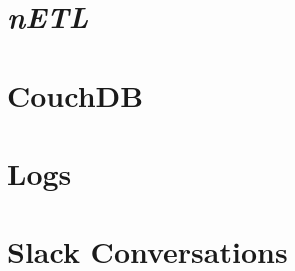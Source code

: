 \documentclass[
    parskip=full,
    a4paper
]{report}
\begin{document}



\begin{appendices}
    \chapter{\textit{nETL}}
    
    
    
    \chapter{CouchDB}
    
    \chapter{Logs}
    
    \chapter{Slack Conversations}
    
    \newpage
    \listoffigures
    \newpage
    \listoftables
    \newpage
\end{appendices}

\end{document}
